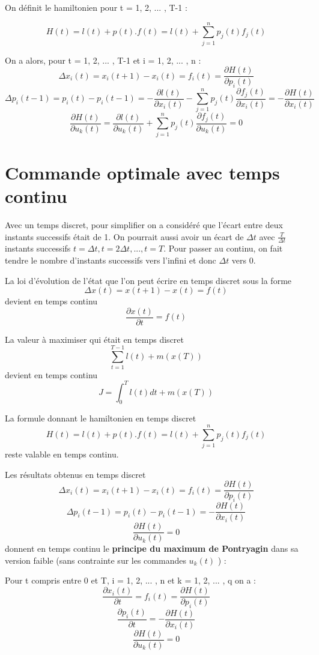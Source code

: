 \documentclass[10pt]{article}
\begin{document}
On définit le hamiltonien pour t = 1, 2, ... , T-1 :

\[ H(t) = l(t) + p(t) . f(t) = l(t) + \sum_{j=1}^n p_j(t) f_j(t) \] 

On a alors, pour t = 1, 2, ... , T-1 et i = 1, 2, ... , n : 
 \[ \Delta x_i(t) = x_i(t+1) - x_i(t) = f_i(t) = \frac{\partial H(t)}{\partial p_i(t)} \]
 \[ \Delta p_i(t-1) = p_i(t) - p_i(t-1) = - \frac{\partial l(t)}{\partial x_i(t)} - \sum_{j=1}^n p_j(t) \frac{\partial f_j(t)}{\partial x_i(t)} = - \frac{\partial H(t)}{\partial x_i(t)} \]
 \[ \frac{\partial H(t)}{\partial u_k(t)} = \frac{\partial l(t)}{\partial u_k(t)} + \sum_{j=1}^n p_j(t) \frac{\partial f_j(t)}{\partial u_k(t)} = 0 \]

\section{Commande optimale avec temps continu}

Avec un temps discret, pour simplifier on a considéré que l'écart entre deux instants successifs était de 1. On pourrait aussi avoir un écart de \( \Delta t \) avec \( \frac{T}{\Delta t} \) instants successifs \( t = \Delta t, t = 2 \Delta t, ... , t = T \). Pour passer au continu, on fait tendre le nombre d'instants successifs vers l'infini et donc \( \Delta t \) vers 0.

La loi d'évolution de l'état que l'on peut écrire en temps discret sous la forme 
\[ \Delta x(t) = x(t+1) - x(t) = f(t) \]
devient en temps continu 
\[ \frac{\partial x(t)}{\partial t} = f(t) \]

La valeur à maximiser qui était en temps discret
\[ \sum_{t=1}^{T-1}l(t) + m(x(T)) \]
devient en temps continu
\[ J = \int_0^T l(t) dt + m(x(T)) \]

La formule donnant le hamiltonien en temps discret 
\[ H(t) = l(t) + p(t) . f(t) = l(t) + \sum_{j=1}^n p_j(t) f_j(t) \]
reste valable en temps continu.

Les résultats obtenus en temps discret
\[ \Delta x_i(t) = x_i(t+1) - x_i(t) = f_i(t) = \frac{\partial H(t)}{\partial p_i(t)} \]
\[ \Delta p_i(t-1) = p_i(t) - p_i(t-1) = - \frac{\partial H(t)}{\partial x_i(t)} \]
\[ \frac{\partial H(t)}{\partial u_k(t)} = 0 \]
donnent en temps continu le \textbf{principe du maximum de Pontryagin} dans sa version faible (sans contrainte sur les commandes \( u_k(t) \) ) :

Pour t compris entre 0 et T, i = 1, 2, ... , n et k = 1, 2, ... , q on a :
\[ \frac{\partial x_i(t)}{\partial t} = f_i(t) = \frac{\partial H(t)}{\partial p_i(t)} \]
\[ \frac{\partial p_i(t)}{\partial t} = - \frac{\partial H(t)}{\partial x_i(t)} \]
\[ \frac{\partial H(t)}{\partial u_k(t)} = 0 \]
\end{document}
